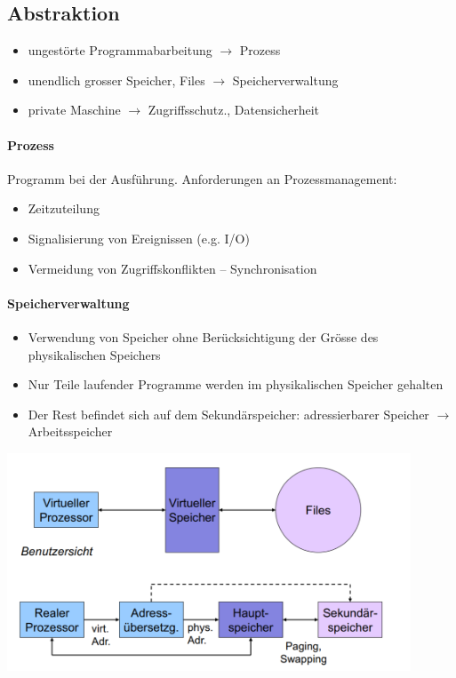 \documentclass[a4paper,12pt]{article}
\begin{document}
\subsection{Abstraktion}
\begin{itemize}
\item ungestörte Programmabarbeitung $ \rightarrow $ Prozess
\item unendlich grosser Speicher, Files $ \rightarrow $ Speicherverwaltung
\item private Maschine $ \rightarrow $ Zugriffsschutz., Datensicherheit
\end{itemize}

\paragraph{Prozess} Programm bei der Ausführung. Anforderungen an Prozessmanagement:
\begin{itemize}
\item Zeitzuteilung
\item Signalisierung von Ereignissen (e.g. I/O)
\item Vermeidung von Zugriffskonflikten -- Synchronisation
\end{itemize}


\paragraph{Speicherverwaltung}
\begin{itemize}
\item Verwendung von Speicher ohne Berücksichtigung der Grösse des physikalischen Speichers
\item Nur Teile laufender Programme werden im physikalischen Speicher gehalten
\item Der Rest befindet sich auf dem Sekundärspeicher: adressierbarer Speicher $\rightarrow$ Arbeitsspeicher
\end{itemize}

\begin{center}
\includegraphics[width=12cm]{img/01_speicher.png}
\end{center}
\end{document}
